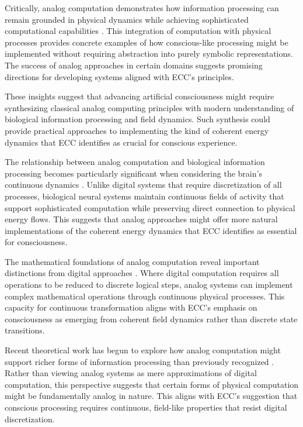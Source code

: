 \begin{refsection}
Critically, analog computation demonstrates how information processing can remain grounded in physical dynamics while achieving sophisticated computational capabilities \cite{PourEl2017}. This integration of computation with physical processes provides concrete examples of how conscious-like processing might be implemented without requiring abstraction into purely symbolic representations. The success of analog approaches in certain domains suggests promising directions for developing systems aligned with ECC's principles.

These insights suggest that advancing artificial consciousness might require synthesizing classical analog computing principles with modern understanding of biological information processing and field dynamics. Such synthesis could provide practical approaches to implementing the kind of coherent energy dynamics that ECC identifies as crucial for conscious experience.

The relationship between analog computation and biological information processing becomes particularly significant when considering the brain's continuous dynamics \cite{Ashby1960}. Unlike digital systems that require discretization of all processes, biological neural systems maintain continuous fields of activity that support sophisticated computation while preserving direct connection to physical energy flows. This suggests that analog approaches might offer more natural implementations of the coherent energy dynamics that ECC identifies as essential for consciousness.

The mathematical foundations of analog computation reveal important distinctions from digital approaches \cite{BialynickiBirula1976}. Where digital computation requires all operations to be reduced to discrete logical steps, analog systems can implement complex mathematical operations through continuous physical processes. This capacity for continuous transformation aligns with ECC's emphasis on consciousness as emerging from coherent field dynamics rather than discrete state transitions.

Recent theoretical work has begun to explore how analog computation might support richer forms of information processing than previously recognized \cite{Cowan2017}. Rather than viewing analog systems as mere approximations of digital computation, this perspective suggests that certain forms of physical computation might be fundamentally analog in nature. This aligns with ECC's suggestion that conscious processing requires continuous, field-like properties that resist digital discretization.


\end{refsection}
